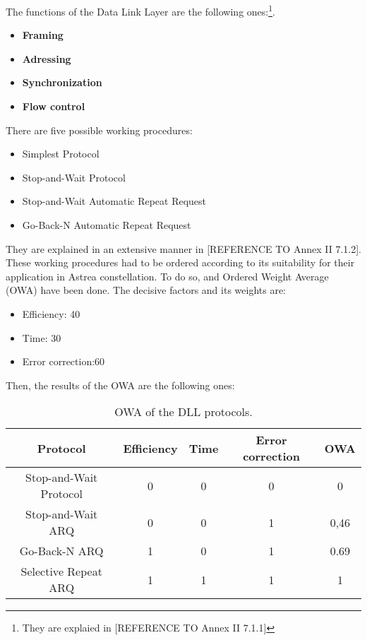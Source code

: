 The functions of the Data Link Layer are the following ones:\footnote{They are explaied in [REFERENCE TO Annex II 7.1.1]}.

\begin{itemize}
\item \textbf{Framing}
\item \textbf{Adressing}
\item \textbf{Synchronization}
\item \textbf{Flow control}
\end{itemize}

There are five possible working procedures:

\begin{itemize}
\item Simplest Protocol
\item Stop-and-Wait Protocol
\item Stop-and-Wait Automatic Repeat Request
\item Go-Back-N Automatic Repeat Request
\end{itemize}

They are explained in an extensive manner in [REFERENCE TO Annex II 7.1.2]. These working procedures had to be ordered according to its suitability for their application in Astrea constellation. To do so, and Ordered Weight Average (OWA) have been done. The decisive factors and its weights are: 

\begin{itemize}
\item Efficiency: 40
\item Time: 30
\item Error correction:60
\end{itemize}

Then, the results of the OWA are the following ones:

\begin{table}[H]
\begin{center}
\begin{tabular}{ | c | c | c | c | c |}
\hline
Protocol&Efficiency&Time&Error correction&OWA\\
\hline
Stop-and-Wait Protocol&0&0&0&0\\
\hline
Stop-and-Wait ARQ&0&0&1&0,46\\
\hline
Go-Back-N ARQ&1&0&1&0.69\\
\hline
Selective Repeat ARQ&1&1&1&1\\
\hline
\end{tabular}
\caption{OWA of the DLL protocols.}
\end{center}
\end{table} 

